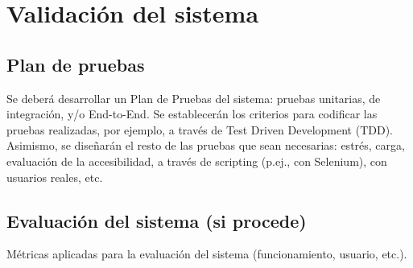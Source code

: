 \vspace*{-1cm}


\section{Validación del sistema} %
\label{sec:validacion_del_sistema}


\subsection{Plan de pruebas}
Se deberá desarrollar un Plan de Pruebas del sistema: pruebas unitarias, de integración, y/o End-to-End. Se establecerán los criterios para codificar las pruebas realizadas, por ejemplo, a través de Test Driven Development (TDD). Asimismo, se diseñarán el resto de las pruebas que sean necesarias: estrés, carga, evaluación de la accesibilidad, a través de scripting (p.ej., con Selenium), con usuarios reales, etc.

\subsection{Evaluación del sistema (si procede)}
Métricas aplicadas para la evaluación del sistema (funcionamiento, usuario, etc.).